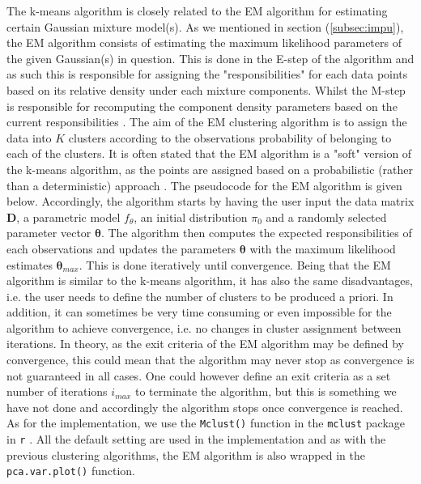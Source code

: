 \documentclass[../thesis.tex]{subfiles}
\begin{document}
\noindent The k-means algorithm is closely related to the EM algorithm \citep{dempster1977maximum} for estimating certain Gaussian mixture model(s). As we mentioned in section (\ref{subsec:impu}), the EM algorithm consists of estimating the maximum likelihood parameters of the given Gaussian(s) in question. This is done in the E-step of the algorithm and as such this is responsible for assigning the "responsibilities" for each data points based on its relative density under each mixture components. Whilst the M-step is responsible for recomputing the component density parameters based on the current responsibilities \citep{friedman2009elements}. The aim of the EM clustering algorithm is to assign the data into $K$ clusters according to the observations probability of belonging to each of the clusters. It is often stated that the EM algorithm is a "soft" version of the k-means algorithm, as the points are assigned based on a probabilistic (rather than a deterministic) approach \citep{james2013introduction}. The pseudocode for the EM algorithm is given below. Accordingly, the algorithm starts by having the user input the data matrix $\mathbf{D}$, a parametric model $f_\theta$, an initial distribution $\pi_0$ and a randomly selected parameter vector $\boldsymbol{\theta}$. The algorithm then computes the expected responsibilities of each observations and updates the parameters $\boldsymbol{\theta}$ with the maximum likelihood estimates $\boldsymbol{\theta}_{max}$. This is done iteratively until convergence. Being that the EM algorithm is similar to the k-means algorithm, it has also the same disadvantages, i.e. the user needs to define the number of clusters to be produced a priori. In addition, it can sometimes be very time consuming or even impossible for the algorithm to achieve convergence, i.e. no changes in cluster assignment between iterations. In theory, as the exit criteria of the EM algorithm may be defined by convergence, this could mean that the algorithm may never stop as convergence is not guaranteed in all cases. One could however define an exit criteria as a set number of iterations $i_{max}$ to terminate the algorithm, but this is something we have not done and accordingly the algorithm stops once convergence is reached. As for the implementation, we use the \texttt{Mclust()} function in the \texttt{mclust} package in \texttt{r} \citep{mclust}. All the default setting are used in the implementation and as with the previous clustering algorithms, the EM algorithm is also wrapped in the \texttt{pca.var.plot()} function.\\
\end{document}

